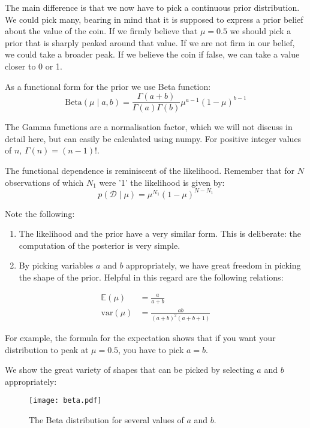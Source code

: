 The main difference is that we now have to pick a continuous prior distribution. We could pick many, bearing in mind that it is supposed to express a prior belief about the value of the coin. If we firmly believe that $\mu = 0.5$ we should pick a prior that is sharply peaked around that value. If we are not firm in our belief, we could take a broader peak. If we believe the coin if false, we can take a value closer to 0 or 1.

As a functional form for the prior we use Beta function:
$$
\mbox{Beta}(\mu \mid a, b) = \frac{\Gamma(a+b)}{\Gamma(a)\Gamma(b)} \mu^{a-1} (1-\mu)^{b-1}
$$

The Gamma functions are a normalisation factor, which we will not discuss in detail here, but can easily be calculated using numpy. For positive integer values of $n$,
$\Gamma(n) = (n-1)!$.


The functional dependence is reminiscent of the likelihood. Remember that
for $N$ observations of which $N_1$ were '1' the likelihood is given by:
$$
p(\mathcal{D} \mid \mu)  = \mu^{N_1}(1 - \mu)^{N - N_1}
$$

Note the following:
\begin{enumerate}
\item The likelihood and the prior have a very similar form. This is deliberate: the computation of the posterior is very simple.
\item By picking variables $a$ and $b$ appropriately, we have great freedom in picking the shape of the prior. Helpful in this regard are the following relations:
\end{enumerate}
  
\begin{align}
\mathbb{E}(\mu) &= \frac{a}{a+b} \\
\mbox{var}(\mu) &= \frac{ab}{(a+b)^2(a+b+1)}
\end{align}

For example, the formula for the expectation shows that if you want your distribution to peak at $\mu =0.5$, you have to pick $a = b$.

We show the great variety of shapes that can be picked by selecting $a$ and $b$ appropriately:
\begin{figure}
\begin{center}
\texttt{[image: beta.pdf]}
\end{center}
\caption{The Beta distribution for several values of $a$ and $b$.}
\end{figure}


